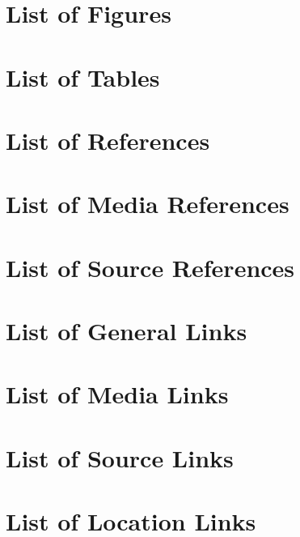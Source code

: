 \placeReferences%
{%
\section{List of Figures}%
\placelist[figure][criterium=all]%
%
\section{List of Tables}%
\placelist[table][criterium=all]%
%
\section{List of References}%
\showReferences%
%
\section{List of Media References}%
\showReferencesMedia%
%
\section{List of Source References}%
\showReferencesSource%
%
\section{List of General Links}%
\showLinks%
%
\section{List of Media Links}%
\showLinksMedias%
%
\section{List of Source Links}%
\showLinksSources%
%
\section{List of Location Links}%
\showLinksLocations%
}

\stopenvironment